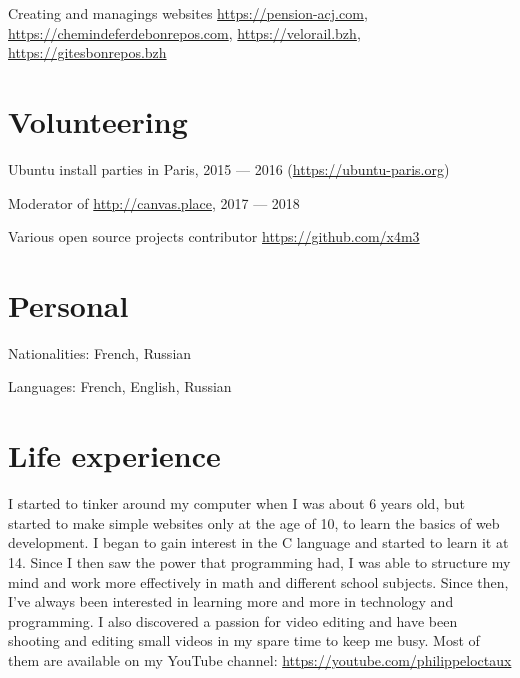 \documentclass[a4paper]{article}
\begin{document}
Creating and managings websites \url{https://pension-acj.com}, \url{https://chemindeferdebonrepos.com}, \url{https://velorail.bzh}, \url{https://gitesbonrepos.bzh}

\section*{Volunteering}

Ubuntu install parties in Paris, 2015 — 2016 (\url{https://ubuntu-paris.org})

Moderator of \url{http://canvas.place}, 2017 — 2018

Various open source projects contributor \url{https://github.com/x4m3}

\section*{Personal}

Nationalities: French, Russian

Languages: French, English, Russian

\section*{Life experience}

I started to tinker around my computer when I was about 6 years old, but started to make simple websites only at the age of 10, to learn the basics of web development.
I began to gain interest in the C language and started to learn it at 14. Since I then saw the power that programming had, I was able to structure my mind and work more effectively in math and different school subjects.
Since then, I've always been interested in learning more and more in technology and programming. I also discovered a passion for video editing and have been shooting and editing small videos in my spare time to keep me busy.
Most of them are available on my YouTube channel: \url{https://youtube.com/philippeloctaux}
\end{document}
